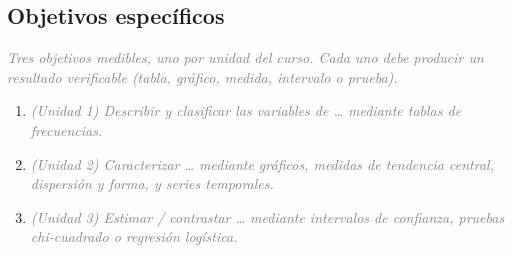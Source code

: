 \documentclass[12pt,a4paper]{article}
\newcommand{\instruccion}[1]{\textcolor{gray}{\textit{#1}}}
\begin{document}
\subsection{Objetivos específicos}

\instruccion{Tres objetivos medibles, uno por unidad del curso. Cada uno debe producir un resultado verificable (tabla, gráfico, medida, intervalo o prueba).}

\begin{enumerate}[label=OE\arabic*., leftmargin=1.6cm]
  \item \instruccion{(Unidad 1) Describir y clasificar las variables de \ldots{} mediante tablas de frecuencias.}
  \item \instruccion{(Unidad 2) Caracterizar \ldots{} mediante gráficos, medidas de tendencia central, dispersión y forma, y series temporales.}
  \item \instruccion{(Unidad 3) Estimar / contrastar \ldots{} mediante intervalos de confianza, pruebas chi-cuadrado o regresión logística.}
\end{enumerate}
\end{document}
